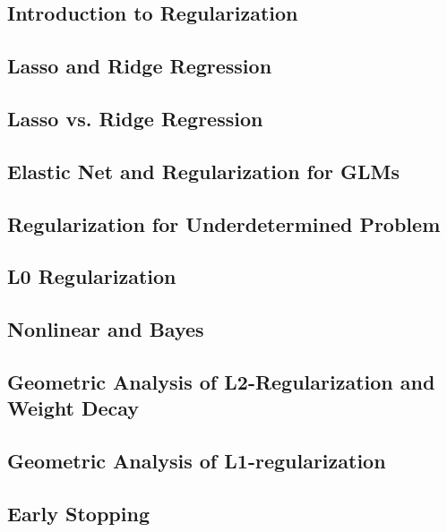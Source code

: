 

\subsection{Introduction to Regularization}


\subsection{Lasso and Ridge Regression}


\subsection{Lasso vs. Ridge Regression}


\subsection{Elastic Net and Regularization for GLMs}


\subsection{Regularization for Underdetermined Problem}


\subsection{L0 Regularization}


\subsection{Nonlinear and Bayes}


\subsection{Geometric Analysis of L2-Regularization and Weight Decay}


\subsection{Geometric Analysis of L1-regularization}


\subsection{Early Stopping}






